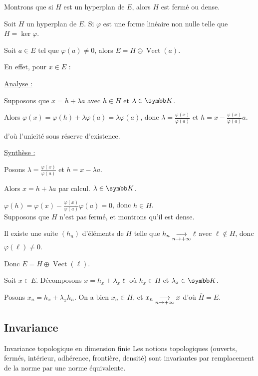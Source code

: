 \begin{exemple}
    Montrons que si $H$ est un hyperplan de $E$, alors $H$ est fermé ou dense.

    \svspace Soit $H$ un hyperplan de $E$. Si $\varphi$ est une forme linéaire non nulle
    telle que $H = \ker \varphi$.

    Soit $a \in E$ tel que $\varphi(a) \neq 0$, alors $E = H \oplus \operatorname{Vect}(a)$.

    En effet, pour $x \in E$ : 
    
    \uline{Analyse :}

    \svspace Supposons que $x = h + \lambda a$ avec $h \in H$ et $\lambda \in \K$.

    Alors $\varphi(x) = \varphi(h) + \lambda \varphi(a) = \lambda \varphi(a)$, donc
    $\lambda = \frac{\varphi(x)}{\varphi(a)}$ et $h = x - \frac{\varphi(x)}{\varphi(a)} a$.

    d'où l'unicité sous réserve d'existence. 

    \uline{Synthèse :}

    Posons $\lambda = \frac{\varphi(x)}{\varphi(a)}$ et $h = x - \lambda a$.

    Alors $x = h + \lambda a$ par calcul. $\lambda \in \K$. 

    $\varphi(h) = \varphi(x) - \frac{\varphi(x)}{\varphi(a)} \varphi(a) = 0$, donc $h \in H$. \\

    Supposons que $H$ n'est pas fermé, et montrons qu'il est dense.

    Il existe une suite $(h_n)$ d'éléments de $H$ telle que 
    $h_n \underset{n \to + \infty}{\longrightarrow} \ell$ avec $\ell \not \in H$, donc $\varphi(\ell) \neq 0$.

    Donc $E = H \oplus \operatorname{Vect}(\ell)$.

    Soit $x \in E$. Décomposons $x = h_x + \lambda_x \ell$ où $h_x \in H$ et $\lambda_x \in \K$.

    Posons $x_n = h_x + \lambda_x h_n$. On a bien $x_n \in H$, et $x_n \underset{n \to + \infty}{\longrightarrow} x$ 
    d'où $\overline H = E$.
\end{exemple}

\subsection{Invariance}

\begin{theoreme}{Invariance topologique en dimension finie}{}
    Les notions topologiques (ouverts, fermés, intérieur, adhérence, frontière, densité) sont invariantes
    par remplacement de la norme par une norme équivalente. 
\end{theoreme}

